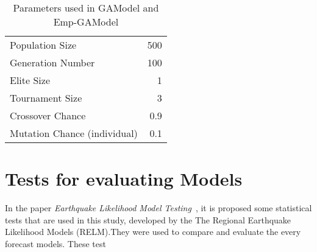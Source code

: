 \begin{table}[!ht]
  \caption{Parameters used in GAModel and Emp-GAModel}
  \label{GAHParameters-}
  \begin{center}
  \begin{tabular}{|l|r|}
    \hline
    Population Size & 500\\
    Generation Number & 100\\
    Elite Size & 1\\
    Tournament Size & 3\\
    Crossover Chance & 0.9\\
    Mutation Chance (individual) & 0.1\\
    \hline    
  \end{tabular}
  \end{center}
\end{table}
\section{Tests for evaluating Models}\label{Tests}

In the paper {\it Earthquake Likelihood Model
  Testing}~\cite{schorlemmer2007earthquake}, it is proposed some
statistical tests that are used in this study, developed by the The
Regional Earthquake Likelihood Models (RELM).They were used to compare
and evaluate the every forecast models. These test